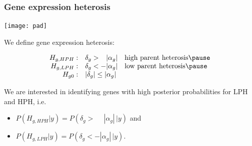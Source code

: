 \documentclass[handout]{beamer}\usepackage[]{graphicx}\usepackage[]{color}
\begin{document}
\begin{frame}
\frametitle{Gene expression heterosis}

\begin{center}
\texttt{[image: pad]}
\end{center}
\pause
We define \alert{gene expression heterosis}:

\[ \begin{array}{rll}
H_{g,HPH}: & \delta_g > \phantom{-}|\alpha_g|  & \mbox{high parent heterosis} \pause \\
H_{g,LPH}: & \delta_g < -|\alpha_g|  & \mbox{low parent heterosis} \pause \\
H_{g0}: & |\delta_g| \le  |\alpha_g| 
\end{array} \]

\pause

We are interested in identifying genes with high posterior probabilities for LPH and HPH, i.e. 
\begin{itemize}
\item $P(H_{g,HPH}|y) = P(\delta_g > \phantom{-}|\alpha_g|\, |y)$ and 
\item $P(H_{g,LPH}|y) = P(\delta_g < -|\alpha_g|\, |y)$. 
\end{itemize}

\end{frame}
\end{document}
